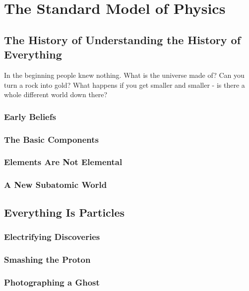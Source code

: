 \chapter{The Standard Model of Physics}

\section{The History of Understanding the History of Everything}

In the beginning people knew nothing. What is the universe made of? Can you turn a rock into gold? What happens if you get smaller and smaller - is there a whole different world down there?

\subsection{Early Beliefs}

\subsection{The Basic Components}

\subsection{Elements Are Not Elemental}

\subsection{A New Subatomic World}

\section{Everything Is Particles}

\subsection{Electrifying Discoveries}

\subsection{Smashing the Proton}

\subsection{Photographing a Ghost}

